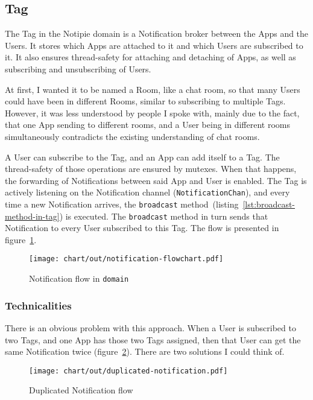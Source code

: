 \subsection{Tag}\label{sec:tag}

The Tag in the Notipie domain
is a Notification broker
between the Apps and the Users.
It stores which Apps are attached to it
and which Users are subscribed to it.
It also ensures thread-safety
for attaching and detaching of Apps,
as well as subscribing and unsubscribing of Users.

At first,
I wanted it to be named a Room,
like a chat room,
so that many Users could have been
in different Rooms,
similar to subscribing to multiple Tags.
However,
it was less understood by people I spoke with,
mainly due to the fact,
that one App sending to different rooms,
and a User being in different rooms simultaneously
contradicts the existing understanding of chat rooms.

A User can subscribe to the Tag,
and an App can add itself to a Tag.
The thread-safety of those operations
are ensured by mutexes.
When that happens,
the forwarding of Notifications
between said App and User is enabled.
The Tag is actively listening
on the Notification channel (\texttt{NotificationChan}),
and every time a new Notification arrives,
the \texttt{broadcast} method~(listing~\ref{lst:broadcast-method-in-tag})
is executed.
The \texttt{broadcast} method in turn sends that Notification
to every User subscribed to this Tag.
The flow is presented in figure~\ref{fig:notification-flowchart}.

\begin{figure}[h]
  \centering
  \texttt{[image: chart/out/notification-flowchart.pdf]}
  \caption{Notification flow in \texttt{domain}}
  \label{fig:notification-flowchart}
\end{figure}

\subsubsection{Technicalities}\label{sec:tag-technicalities}

There is an obvious problem with this approach.
When a User is subscribed to two Tags,
and one App has those two Tags assigned,
then that User can get the same Notification twice
(figure~\ref{fig:duplicated-notification}).
There are two solutions I could think of.

\begin{figure}[h]
  \centering
  \texttt{[image: chart/out/duplicated-notification.pdf]}
  \caption{Duplicated Notification flow}
  \label{fig:duplicated-notification}
\end{figure}

